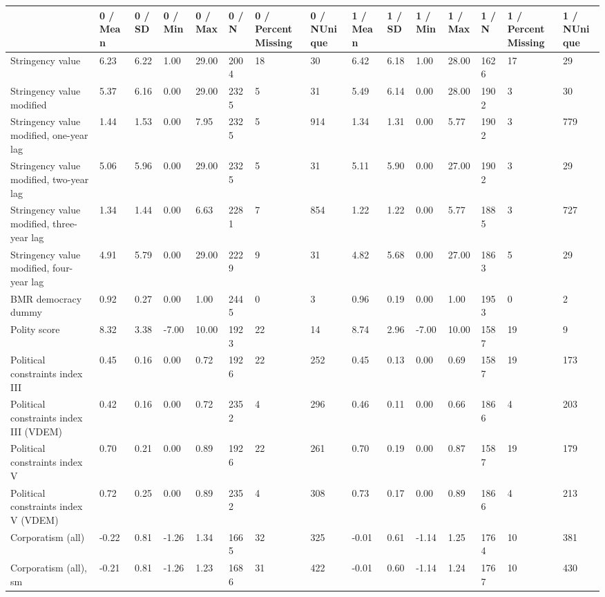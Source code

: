 
\begin{longtable}{lllllllllllllll}
\toprule
  & 0 / Mean & 0 / SD & 0 / Min & 0 / Max & 0 / N & 0 / PercentMissing & 0 / NUnique & 1 / Mean & 1 / SD & 1 / Min & 1 / Max & 1 / N & 1 / PercentMissing & 1 / NUnique\\
\midrule
Stringency value & 6.23 & 6.22 & 1.00 & 29.00 & 2004 & 18 & 30 & 6.42 & 6.18 & 1.00 & 28.00 & 1626 & 17 & 29\\
Stringency value modified & 5.37 & 6.16 & 0.00 & 29.00 & 2325 & 5 & 31 & 5.49 & 6.14 & 0.00 & 28.00 & 1902 & 3 & 30\\
Stringency value modified, one-year lag & 1.44 & 1.53 & 0.00 & 7.95 & 2325 & 5 & 914 & 1.34 & 1.31 & 0.00 & 5.77 & 1902 & 3 & 779\\
Stringency value modified, two-year lag & 5.06 & 5.96 & 0.00 & 29.00 & 2325 & 5 & 31 & 5.11 & 5.90 & 0.00 & 27.00 & 1902 & 3 & 29\\
Stringency value modified, three-year lag & 1.34 & 1.44 & 0.00 & 6.63 & 2281 & 7 & 854 & 1.22 & 1.22 & 0.00 & 5.77 & 1885 & 3 & 727\\
\addlinespace
Stringency value modified, four-year lag & 4.91 & 5.79 & 0.00 & 29.00 & 2229 & 9 & 31 & 4.82 & 5.68 & 0.00 & 27.00 & 1863 & 5 & 29\\
BMR democracy dummy & 0.92 & 0.27 & 0.00 & 1.00 & 2445 & 0 & 3 & 0.96 & 0.19 & 0.00 & 1.00 & 1953 & 0 & 2\\
Polity score & 8.32 & 3.38 & -7.00 & 10.00 & 1923 & 22 & 14 & 8.74 & 2.96 & -7.00 & 10.00 & 1587 & 19 & 9\\
Political constraints index III & 0.45 & 0.16 & 0.00 & 0.72 & 1926 & 22 & 252 & 0.45 & 0.13 & 0.00 & 0.69 & 1587 & 19 & 173\\
Political constraints index III (VDEM) & 0.42 & 0.16 & 0.00 & 0.72 & 2352 & 4 & 296 & 0.46 & 0.11 & 0.00 & 0.66 & 1866 & 4 & 203\\
\addlinespace
Political constraints index V & 0.70 & 0.21 & 0.00 & 0.89 & 1926 & 22 & 261 & 0.70 & 0.19 & 0.00 & 0.87 & 1587 & 19 & 179\\
Political constraints index V (VDEM) & 0.72 & 0.25 & 0.00 & 0.89 & 2352 & 4 & 308 & 0.73 & 0.17 & 0.00 & 0.89 & 1866 & 4 & 213\\
Corporatism (all) & -0.22 & 0.81 & -1.26 & 1.34 & 1665 & 32 & 325 & -0.01 & 0.61 & -1.14 & 1.25 & 1764 & 10 & 381\\
Corporatism (all), sm & -0.21 & 0.81 & -1.26 & 1.23 & 1686 & 31 & 422 & -0.01 & 0.60 & -1.14 & 1.24 & 1767 & 10 & 430\\

\end{longtable}
